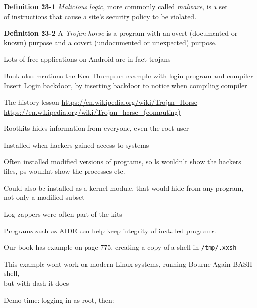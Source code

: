 \documentclass[Screen16to9,17pt]{foils}
\begin{document}
\begin{list1}
\item {\bf Definition 23-1} \emph{Malicious logic}, more commonly called \emph{malware}, is a set\\
 of instructions that cause a site's security policy to be violated.
\item {\bf Definition 23-2} A \emph{Trojan horse} is a program with an overt (documented or\\
known) purpose and a covert (undocumented or unexpected) purpose.

\item Lots of free applications on Android are in fact trojans

\item Book also mentions the Ken Thompson example with login program and compiler\\Insert Login backdoor, by inserting backdoor to notice when compiling compiler \smiley
\end{list1}

The history lesson
\url{https://en.wikipedia.org/wiki/Trojan_Horse}\\
\url{https://en.wikipedia.org/wiki/Trojan_horse_(computing)}



\begin{list1}
\item Rootkits hides information from everyone, even the root user
\item Installed when hackers gained access to systems
\item Often installed modified versions of programs, so ls wouldn't show the hackers files, ps wouldnt show the processes etc.
\item Could also be installed as a kernel module, that would hide from any program, not only a modified subset
\item Log zappers were often part of the kits
\item Programs such as AIDE can help keep integrity of installed programs:\\
\end{list1}




\begin{list1}
\item Our book has example on page 775, creating a copy of a shell in \verb+/tmp/.xxsh+
\item This example wont work on modern Linux systems, running Bourne Again BASH shell, \\but with dash it does
\item Demo time: logging in as root, then:
\end{list1}
\end{document}
